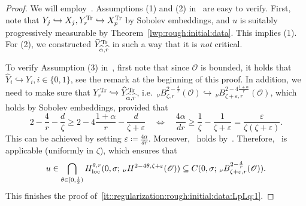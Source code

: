 \documentclass[reqno]{amsart}
\newcommand{\sO}{\mathscr{O}}
\newcommand{\ce}{\coloneqq}
\newcommand{\seq}{\subseteq}
\newcommand{\1}{\mathbf{1}}
\newcommand{\loc}{\textup{loc}}
\newcommand{\nH}{\ensuremath{\,_\nu H}}
\begin{document}
\begin{proof}
				We will employ~\cite[Theorem 6.3]{agrestiNonlinearParabolicStochastic2022a}. Assumptions (1) and (2) in~\cite[Theorem 6.3]{agrestiNonlinearParabolicStochastic2022a} are easy to verify. First, note that 
				$Y_j\hookrightarrow X_j, Y_r^{\textup{Tr}}\hookrightarrow X_p^{\textup{Tr}}$ by Sobolev embeddings, and $u$ is suitably progressively measurable by Theorem~\ref{lwp:rough:initial:data}. This implies (1). For (2), we constructed $\widehat Y_{\widehat \alpha,\widehat r}^{\textup{Tr}}$ in such a way that it is \emph{not} critical. 
				
				To verify Assumption (3) in~\cite[Theorem 6.3]{agrestiNonlinearParabolicStochastic2022a}, first note that since $\sO $ is bounded, it holds that $\widehat{Y}_i \hookrightarrow Y_i, i\in \{0,1\}$, see the remark at the beginning of this proof. In addition, we need to make sure that $Y_r^{\textup{Tr}}\hookrightarrow \widehat Y^{\textup{Tr}}_{\widehat\alpha,\widehat r}$, i.e.\ $_\nu B_{\zeta,r}^{2-\frac{4}{r}}(\sO)\hookrightarrow \,_\nu B_{\zeta+\varepsilon,r}^{2-4\frac{1+\alpha}{r}}(\sO)$, which holds by Sobolev embeddings, provided that 
				\[2-\frac{4}{r}-\frac{d}{\zeta}\ge 2-4\frac{1+\alpha}{r}-\frac{d}{\zeta+\varepsilon} \quad \Longleftrightarrow \quad \frac{4\alpha}{dr}\ge \frac{1}{\zeta}-\frac{1}{\zeta+\varepsilon}= \frac{\varepsilon}{\zeta(\zeta+\varepsilon)}.\]
				This can be achieved by setting $\varepsilon\ce \frac{4\alpha}{dr}$. 
                Moreover,~\cite[(6.1)]{agrestiNonlinearParabolicStochastic2022a} holds by~\cite[Lemma 6.2 (1)]{agrestiNonlinearParabolicStochastic2022a}. Therefore,~\cite[Theorem 6.3]{agrestiNonlinearParabolicStochastic2022a} is applicable (uniformly in $\zeta$), which ensures that 
				\begin{equation}
					u\in \bigcap_{\theta\in [0,\frac{1}{2})} H_{\loc}^{\theta,r}(0,\sigma; \nH^{2-4\theta,\zeta+\varepsilon}(\sO)) \seq C(0,\sigma; \, _\nu B_{\zeta+\varepsilon,r}^{2-\frac{4}{r}}(\sO)).
				\end{equation}
				This finishes the proof of~\ref{it::regularization:rough:initial:data:LpLq:1}. 
                

\end{proof}
\end{document}

